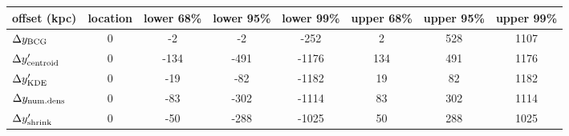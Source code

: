 \begin{tabular}{lccccccc}
\toprule
offset (kpc) &  location &  lower 68\% &  lower 95\% &  lower 99\% &  upper 68\% &  upper 95\% &  upper 99\% \\
\midrule
$\Delta y_{\rm BCG}$       &         0 &           -2 &          -2 &        -252
&          2 &         528 &        1107 \\
$\Delta y_{\rm centroid}'$ &         0 &        -134 &        -491 &       -1176 &         134 &         491 &        1176 \\
$\Delta y_{\rm KDE}'$      &         0 &         -19 &         -82 &       -1182 &          19 &          82 &        1182 \\
$\Delta y_{\rm num.dens}$  &         0 &         -83 &        -302 &       -1114 &          83 &         302 &        1114 \\
$\Delta y_{\rm shrink}'$   &         0 &         -50 &        -288 &       -1025 &          50 &         288 &        1025 \\
\bottomrule
\end{tabular}
